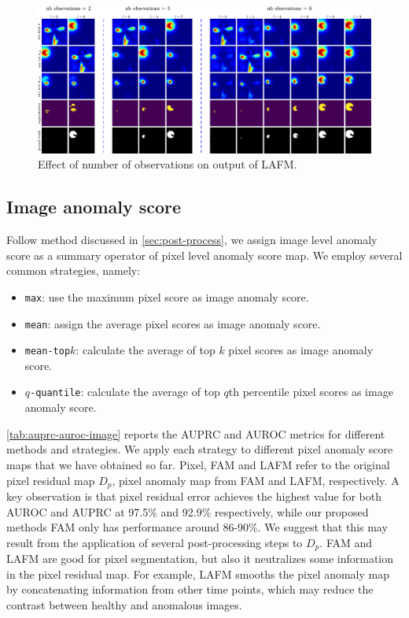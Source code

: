 \begin{figure}[htbp]
    \centering
    \includegraphics[width=\linewidth]{figures/lafm-vary-nb-fig.pdf}
    \caption{Effect of number of observations on output of LAFM.}
    \label{fig:lafm-vary-nb}   
\end{figure}

\subsection{Image anomaly score}
\label{sec:image-auprc-auroc}

Follow method discussed in \cref{sec:post-process}, we assign image level anomaly score as a summary operator of pixel level anomaly score map. We employ several common strategies, namely: 
\begin{itemize}
    \item \texttt{max}: use the maximum pixel score as image anomaly score. 
    \item \texttt{mean}: assign the average pixel scores as image anomaly score. 
    \item \texttt{mean-top$k$}: calculate the average of top $k$ pixel scores as image anomaly score. 
    \item \texttt{$q$-quantile}: calculate the average of top $q$th percentile pixel scores as image anomaly score. 
\end{itemize}

\cref{tab:auprc-auroc-image} reports the AUPRC and AUROC metrics for different methods and strategies. We apply each strategy to different pixel anomaly score maps that we have obtained so far. Pixel, FAM and LAFM refer to the original pixel residual map $D_p$, pixel anomaly map from FAM and LAFM, respectively. A key observation is that pixel residual error achieves the highest value for both AUROC and AUPRC at 97.5\% and 92.9\% respectively, while our proposed methods FAM only has performance around 86-90\%. We suggest that this may result from the application of several post-processing steps to $D_p$. FAM and LAFM are good for pixel segmentation, but also it neutralizes some information in the pixel residual map. For example, LAFM smooths the pixel anomaly map by concatenating information from other time points, which may reduce the contrast between healthy and anomalous images. 

